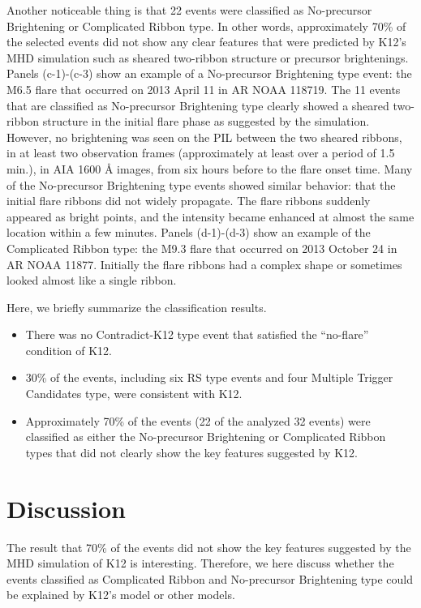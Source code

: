 \documentclass[10pt,preprint2]{aastex}
\begin{document}
Another noticeable thing is that 22 events were classified as No-precursor Brightening or Complicated Ribbon type.
In other words, approximately 70\% of the selected events did not show any clear features that were predicted by K12's MHD simulation such as sheared two-ribbon structure or precursor brightenings.
Panels (c-1)-(c-3) show an example of a No-precursor Brightening type event: the M6.5 flare that occurred on 2013 April 11 in AR NOAA 118719.
The 11 events that are classified as No-precursor Brightening type clearly showed a sheared two-ribbon structure in the initial flare phase as suggested by the simulation.
However, no brightening was seen on the PIL between the two sheared ribbons, in at least two observation frames (approximately at least over a period of 1.5 min.), in AIA 1600 {\AA} images, from six hours before to the flare onset time.
Many of the No-precursor Brightening type events showed similar behavior: that the initial flare ribbons did not widely propagate.
The flare ribbons suddenly appeared as bright points, and the intensity became enhanced at almost the same location within a few minutes.
Panels (d-1)-(d-3) show an example of the Complicated Ribbon type: the M9.3 flare that occurred on 2013 October 24 in AR NOAA 11877.
Initially the flare ribbons had a complex shape or sometimes looked almost like a single ribbon.

Here, we briefly summarize the classification results.
\begin{itemize}
	\item There was no Contradict-K12 type event that satisfied the ``no-flare'' condition of K12.
	\item 30\% of the events, including six RS type events and four Multiple Trigger Candidates type, were consistent with K12.
	\item Approximately 70\% of the events (22 of the analyzed 32 events) were classified as either the No-precursor Brightening or Complicated Ribbon types that did not clearly show the key features suggested by K12.
\end{itemize}


\section{Discussion} \label{sec:discussion}

The result that 70\% of the events did not show the key features suggested by the MHD simulation of K12 is interesting.
Therefore, we here discuss whether the events classified as Complicated Ribbon and No-precursor Brightening type could be explained by K12's model or other models.
\end{document}
